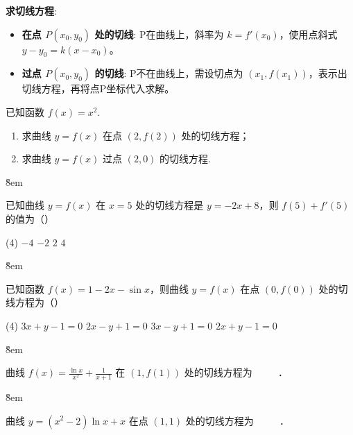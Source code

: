 \begin{theorem}
    \textbf{求切线方程}:
    \begin{itemize}
        \item \textbf{在点 $P(x_0, y_0)$ 处的切线}: P在曲线上，斜率为 $k=f'(x_0)$，使用点斜式 $y-y_0 = k(x-x_0)$。
        \item \textbf{过点 $P(x_0, y_0)$ 的切线}: P不在曲线上，需设切点为 $(x_1, f(x_1))$，表示出切线方程，再将点P坐标代入求解。
    \end{itemize}
\end{theorem}
\begin{example}
    已知函数 $f(x) = x^{2}$.
    \begin{enumerate}
        \item[(1)] 求曲线 $y = f(x)$ 在点 $(2,f(2))$ 处的切线方程；
        \item[(2)] 求曲线 $y = f(x)$ 过点 $(2,0)$ 的切线方程.
    \end{enumerate}
\end{example}

\v{8em}

\begin{example}
    已知曲线 $y = f(x)$ 在 $x = 5$ 处的切线方程是 $y = - 2x + 8$，则 $f(5) + f'(5)$ 的值为（\quad）
    \begin{tasks}(4)
        \task $- 4$ \task $- 2$ \task $2$ \task $4$
    \end{tasks}
\end{example}

\v{8em}

\begin{example}
    已知函数 $f(x) = 1 - 2x - \sin x$，则曲线 $y = f(x)$ 在点 $(0,f(0))$ 处的切线方程为（\quad）
    \begin{tasks}(4)
        \task $3x + y - 1 = 0$
        \task $2x - y + 1 = 0$
        \task $3x - y + 1 = 0$
        \task $2x + y - 1 = 0$
    \end{tasks}
\end{example}

\v{8em}

\begin{example}
    曲线 $f(x)=\frac{\ln x}{x^2}+\frac{1}{x+1}$ 在 $(1, f(1))$ 处的切线方程为
    \underline{$\qquad$} ．
\end{example}

\v{8em}

\begin{example}
    曲线 $y=\left(x^2-2\right) \ln x+x$ 在点 $(1,1)$ 处的切线方程为 \underline{$\qquad$} ．
\end{example}

